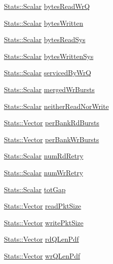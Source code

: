 \begin{DoxyCompactItemize}
\hyperlink{classStats_1_1Scalar}{Stats::Scalar} \hyperlink{classDRAMCtrl_ae2ea884ed0a7e793cabc56748b833ed2}{bytesReadWrQ}
\item 
\hyperlink{classStats_1_1Scalar}{Stats::Scalar} \hyperlink{classDRAMCtrl_a98c4533d0a7053d00f6882f984ebdaef}{bytesWritten}
\item 
\hyperlink{classStats_1_1Scalar}{Stats::Scalar} \hyperlink{classDRAMCtrl_afd688f67c6a876a7b272e2ec9221fc8f}{bytesReadSys}
\item 
\hyperlink{classStats_1_1Scalar}{Stats::Scalar} \hyperlink{classDRAMCtrl_acaf3b49004885b5bc8d40fef342c14c1}{bytesWrittenSys}
\item 
\hyperlink{classStats_1_1Scalar}{Stats::Scalar} \hyperlink{classDRAMCtrl_a234c092fa122ea27676236c3b6f11bcb}{servicedByWrQ}
\item 
\hyperlink{classStats_1_1Scalar}{Stats::Scalar} \hyperlink{classDRAMCtrl_accaed2ab83bb63d6ddff7bfa861ea537}{mergedWrBursts}
\item 
\hyperlink{classStats_1_1Scalar}{Stats::Scalar} \hyperlink{classDRAMCtrl_a10a3647b9ff175594214578eece1e1f7}{neitherReadNorWrite}
\item 
\hyperlink{classStats_1_1Vector}{Stats::Vector} \hyperlink{classDRAMCtrl_a1a6c6b88a19805ae5453e5811633f884}{perBankRdBursts}
\item 
\hyperlink{classStats_1_1Vector}{Stats::Vector} \hyperlink{classDRAMCtrl_ae757d149b2ff05a908b6ceb28f53decc}{perBankWrBursts}
\item 
\hyperlink{classStats_1_1Scalar}{Stats::Scalar} \hyperlink{classDRAMCtrl_acc056895269ee73447f6e9d814a22319}{numRdRetry}
\item 
\hyperlink{classStats_1_1Scalar}{Stats::Scalar} \hyperlink{classDRAMCtrl_a961b9dc82d0ef2814dbdbc498a20e9b3}{numWrRetry}
\item 
\hyperlink{classStats_1_1Scalar}{Stats::Scalar} \hyperlink{classDRAMCtrl_ad5c827068947b103cac8503aa45cf6e5}{totGap}
\item 
\hyperlink{classStats_1_1Vector}{Stats::Vector} \hyperlink{classDRAMCtrl_aee4577f07fe67bcc60ba3c504b35c9f3}{readPktSize}
\item 
\hyperlink{classStats_1_1Vector}{Stats::Vector} \hyperlink{classDRAMCtrl_aecc027383223e3500a37a9646607df81}{writePktSize}
\item 
\hyperlink{classStats_1_1Vector}{Stats::Vector} \hyperlink{classDRAMCtrl_a34cdc0482a9faf13f94abb3a37fa90b8}{rdQLenPdf}
\item 
\hyperlink{classStats_1_1Vector}{Stats::Vector} \hyperlink{classDRAMCtrl_ace3009d78850dc82f90724de8df96227}{wrQLenPdf}

\end{DoxyCompactItemize}

